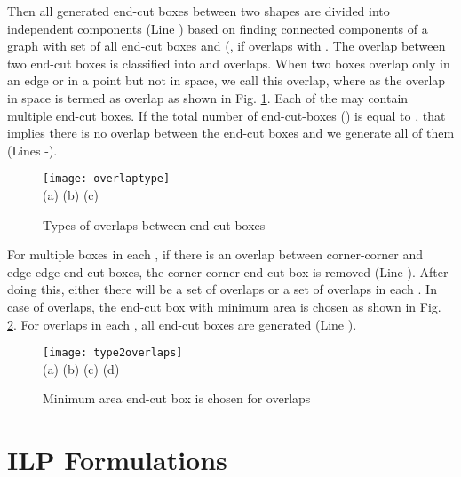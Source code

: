 \documentclass[12pt]{spieman}
\theoremstyle{plain}
\begin{document}
\begin{spacing}{1}
Then all generated end-cut boxes between two shapes are divided into independent components  (Line ) based on finding connected components of a graph  with  set of all end-cut boxes and (, if  overlaps with . The overlap between two end-cut boxes is classified into  and  overlaps. When two boxes overlap only in an edge or in a point but not in space, we call this  overlap, where as the overlap in space is termed as  overlap as shown in Fig. \ref{fig:overlaptype}. Each of the  may contain multiple end-cut boxes. If the total number of end-cut-boxes () is equal to , that implies there is no overlap between the end-cut boxes and we generate all of them (Lines -). 

\begin{figure}[htb]
  \centering
  \texttt{[image: overlaptype]}
  \\ \hspace{0.4cm} (a) \hspace{3.8cm} (b) \hspace{3.8cm} (c)
  \caption{Types of overlaps between end-cut boxes}
  \label{fig:overlaptype}
\end{figure}

For multiple boxes in each , if there is an overlap between corner-corner and edge-edge end-cut boxes, the corner-corner end-cut box is removed (Line ).
After doing this, either there will be a set of  overlaps or a set of  overlaps in each .
In case of  overlaps, the end-cut box with minimum area is chosen as shown in Fig. \ref{fig:type2overlaps}.
For  overlaps in each , all end-cut boxes are generated (Line ).



\begin{figure}[htb]
  \centering
  \texttt{[image: type2overlaps]} 
  \\ \hspace{1.4cm} (a) \hspace{3.0cm} (b) \hspace{3.0cm} (c) \hspace{3.0cm} (d)
  \caption{Minimum area end-cut box is chosen for  overlaps}
  \label{fig:type2overlaps}
\end{figure}



\section{ILP Formulations}
\label{sec:tplec_algo}



\end{spacing}
\end{document}
